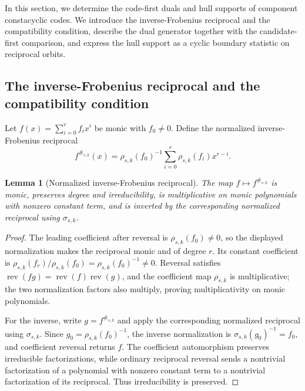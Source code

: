 \documentclass[11pt]{article}
\theoremstyle{plain}
\newtheorem{lemma}{Lemma}
\theoremstyle{definition}
\theoremstyle{remark}
\begin{document}
In this section, we determine the code-first duals and hull supports of component constacyclic codes. We introduce the inverse-Frobenius reciprocal and the compatibility condition, describe the dual generator together with the candidate-first comparison, and express the hull support as a cyclic boundary statistic on reciprocal orbits.

\subsection{The inverse-Frobenius reciprocal and the compatibility condition}

Let $f(x)=\sum_{i=0}^{r}f_i x^i$ be monic with $f_0\neq 0$. Define the normalized inverse-Frobenius reciprocal
\begin{equation}\label{eq:reciprocal}
f^{\#_{s,k}}(x)
 =\rho_{s,k}(f_0)^{-1}
   \sum_{i=0}^{r}\rho_{s,k}(f_i)x^{r-i}.
\end{equation}

\begin{lemma}[Normalized inverse-Frobenius reciprocal]\label{lem:reciprocal}
The map $f\mapsto f^{\#_{s,k}}$ is monic, preserves degree and irreducibility, is multiplicative on monic polynomials with nonzero constant term, and is inverted by the corresponding normalized reciprocal using $\sigma_{s,k}$.
\end{lemma}

\begin{proof}
The leading coefficient after reversal is $\rho_{s,k}(f_0)\ne0$, so the displayed normalization makes the reciprocal monic and of degree $r$. Its constant coefficient is $\rho_{s,k}(f_r)/\rho_{s,k}(f_0)=\rho_{s,k}(f_0)^{-1}\ne0$. Reversal satisfies $\operatorname{rev}(fg)=\operatorname{rev}(f)\operatorname{rev}(g)$, and the coefficient map $\rho_{s,k}$ is multiplicative; the two normalization factors also multiply, proving multiplicativity on monic polynomials.

For the inverse, write $g=f^{\#_{s,k}}$ and apply the corresponding normalized reciprocal using $\sigma_{s,k}$. Since $g_0=\rho_{s,k}(f_0)^{-1}$, the inverse normalization is $\sigma_{s,k}(g_0)^{-1}=f_0$, and coefficient reversal returns $f$. The coefficient automorphism preserves irreducible factorizations, while ordinary reciprocal reversal sends a nontrivial factorization of a polynomial with nonzero constant term to a nontrivial factorization of its reciprocal. Thus irreducibility is preserved.
\end{proof}
\end{document}
